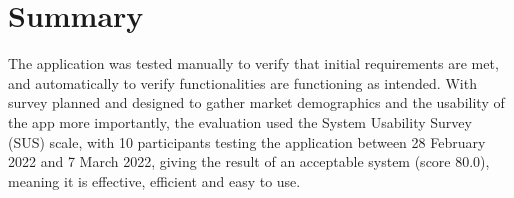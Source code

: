 \documentclass[../main.tex]{subfiles}
\begin{document}
\section*{Summary}

The application was tested manually to verify that initial requirements are met, and automatically to verify functionalities are functioning as intended. With survey planned and designed to gather market demographics and the usability of the app more importantly, the evaluation used the System Usability Survey (SUS) scale, with 10 participants testing the application between 28 February 2022 and 7 March 2022, giving the result of an acceptable system (score 80.0), meaning it is effective, efficient and easy to use.
\end{document}
